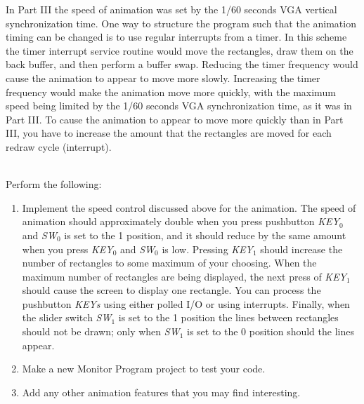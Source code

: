 \documentclass[epsfig,10pt,fullpage]{article}
\newcommand{\CommonDocsPath}{../../../../common/docs}
\begin{document}
In Part III the speed of animation was set by the 1/60 seconds VGA vertical synchronization time.
One way to structure the program such that the animation timing can be changed is to use regular 
interrupts from a timer. In this scheme the timer interrupt service routine would move the
rectangles, draw them on the back buffer, and then perform a buffer swap. Reducing the
timer frequency would cause the animation to appear to move more slowly. Increasing the
timer frequency would make the animation move more quickly, with the maximum speed being limited
by the 1/60 seconds VGA synchronization time, as it was in Part III.  To cause the animation 
to appear to move more quickly than in Part III, you have to increase the amount that the 
rectangles are moved for each redraw cycle (interrupt).

~\\
Perform the following:

\begin{enumerate}

\item Implement the speed control discussed above for the animation. The speed of animation 
should approximately double when you press pushbutton {\it KEY}$_0$ and {\it SW}$_0$ is set to the 1 position, and it should reduce by 
the same amount when you press {\it KEY}$_0$ and {\it SW}$_0$ is low. Pressing {\it KEY}$_1$ should increase the number
of rectangles to some maximum of your choosing. When the maximum number of rectangles are being
displayed, the next press of {\it KEY}$_1$ should cause the screen to display one rectangle. You can process
the pushbutton {\it KEYs} using either polled I/O or using interrupts. Finally, when
the slider switch {\it SW}$_1$ is set to the 1 position the lines between rectangles should 
not be drawn; only when {\it SW}$_1$ is set to the 0 position should the lines appear.

\item Make a new Monitor Program project to test your code.

\item Add any other animation features that you may find interesting.
\end{enumerate}



\end{document}
